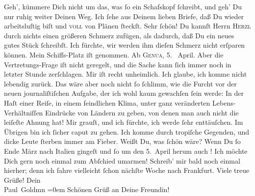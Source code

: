 \begin{ledgroupsized}[t]{13cm}
           \pstart
           Geh’, kümmere Dich nicht um das, was ſo ein Schafskopf ſchreibt, und geh’ Du nur ruhig weiter Deinen Weg.
               Ich ſehe aus Deinem lieben Briefe, daß Du wieder arbeitsluſtig biſt und \textsc{voll} von Plänen ſteckſt. Sehr ſchön! Du kannſt Herrn \textsc{Herzl} durch nichts einen größeren Schmerz zufügen, als dadurch, daß Du ein neues
               gutes Stück ſchreibſt. Ich fürchte, wir werden ihm dieſen Schmerz nicht erſparen
               können.\pend
           \pstart
           Mein Schiffs-Platz iſt
               genommen. Ab \textsc{Genua}, 5.  April.
               Aber die Vertretungs-Frage iſt
               nicht geregelt, und die {\pb}Sache kann ſich immer noch
               in letzter Stunde zerſchlagen.\pend
           \pstart
           Mir iſt recht unheimlich. Ich glaube, ich komme nicht lebendig zurück. Das wäre aber
               noch nicht ſo ſchlimm, wie die Furcht vor der neuen journaliſtiſchen Aufgabe, der ich
                  \strikeout{\textcolor{gray}{w}} wohl kaum gewachſen ſein werde: In der Haſt einer Reiſe, in einem feindlichen
               Klima, unter ganz veränderten Lebens-Verhältniſſen Eindrücke von Ländern zu geben,
                  \strikeout{\textcolor{gray}{×}}{ } von denen man auch nicht die
               leiſeſte Ahnung hat! Mir grauſt, und ich fürchte, ich werde ſehr enttäuſchen. Im
               Übrigen bin ich ſicher caput zu gehen. Ich komme durch tropiſche {\pb}Gegenden, und dicke Leute ſterben immer am
               Fieber.\pend
           \pstart
           Weißt Du, was ſchön wäre? Wenn Du ſo  Ende März nach Italien gingeſt und ſo um den 5. April herum
               auch \label{K_L02841-2v}\label{K_L02841-2h}!
               Ich möchte Dich gern noch einmal zum Abſchied umarmen!\pend
           \pstart
           Schreib’ mir bald noch einmal hierher; denn ich fahre vielleicht ſchon nächſte Woche
               nach Frankfurt.\pend
           \pstart
           Viele treue Grüße!\pend
           \pstart
           Dein {\\[\baselineskip]}\spacefill\mbox{Paul Goldmn}\pend
           \leftskip=0em{}\pstart
           \noindent{}Schönen Grüß an Deine Freundin!\pend
           
         
         \endnumbering{}\end{ledgroupsized}  \newcommand{\dateiname}{L02841}\newcommand{\titel}{Paul Goldmann an Arthur Schnitzler, 7. 3. [1898]}\newcommand{\editorInnen}{Martin Anton Müller und Laura Untner}
      